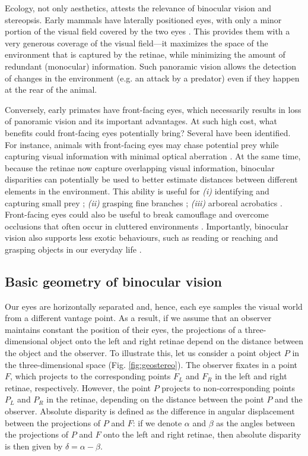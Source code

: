 Ecology, not only aesthetics, attests the relevance of binocular vision and stereopsis. Early mammals have laterally positioned eyes, with only a minor portion of the visual field covered by the two eyes \cite{Allman:1999fk}. This provides them with a very generous coverage of the visual field---it maximizes the space of the environment that is captured by the retinae, while minimizing the amount of redundant (monocular) information. Such panoramic vision allows the detection of changes in the environment (e.g. an attack by a predator) even if they happen at the rear of the animal.

Conversely, early primates have front-facing eyes, which necessarily results in loss of panoramic vision and its important advantages. At such high cost, what benefits could front-facing eyes potentially bring? Several have been identified. For instance, animals with front-facing eyes may chase potential prey while capturing visual information with minimal optical aberration \cite{Allman:1999fk}. At the same time, because the retinae now capture overlapping visual information, binocular disparities can potentially be used to better estimate distances between different elements in the environment. This ability is useful for \textit{(i)} identifying and capturing small prey \cite{Cartmill:1992ys}; \textit{(ii)} grasping fine branches \cite{Martin:1990kx}; \textit{(iii)} arboreal acrobatics \cite{Clark:1934zr}. Front-facing eyes could also be useful to break camouflage \cite{Julesz:1971uq} and overcome occlusions that often occur in cluttered environments \cite{Changizi:2008ij}. Importantly, binocular vision also supports less exotic behaviours, such as reading \cite{Jainta:2014vn} or reaching and grasping objects in our everyday life \cite{Melmoth:2006ve}.

\subsection{Basic geometry of binocular vision}\label{sec:basic-geom-binoc}

Our eyes are horizontally separated and, hence, each eye samples the visual world from a different vantage point. As a result, if we assume that an observer maintains constant the position of their eyes, the projections of a three-dimensional object onto the left and right retinae depend on the distance between the object and the observer. To illustrate this, let us consider a point object $P$ in the three-dimensional space (Fig. \ref{fig:geostereo}). The observer fixates in a point $F$, which projects to the corresponding points $F_{L}$ and $F_{R}$ in the left and right retinae, respectively. However, the point $P$ projects to non-corresponding points $P_{L}$ and $P_{R}$  in the retinae, depending on the distance between the point $P$ and the observer. Absolute disparity is defined as the difference in angular displacement between the projections of $P$ and $F$: if we denote $\alpha$ and $\beta$ as the angles between the projections of $P$ and $F$ onto the left and right retinae, then absolute disparity is then given by $\delta = \alpha - \beta$.

